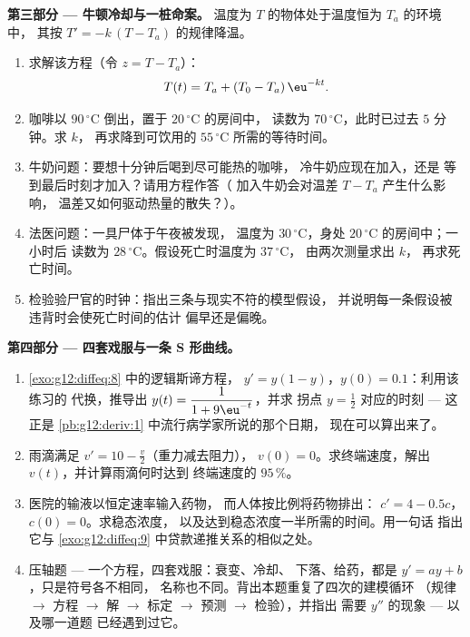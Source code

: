 \begin{problem}
\medskip
\noindent\textbf{第三部分 --- 牛顿冷却与一桩命案。}
温度为 $T$ 的物体处于温度恒为 $T_a$ 的环境中，
其按 $T' = -k\,(T - T_a)$ 的规律降温。
\begin{enumerate}[resume]
  \item 求解该方程（令 $z = T - T_a$）：
        \[
        T(t) = T_a + (T_0 - T_a)\,\eu^{-kt} .
        \]
  \item 咖啡以 $90\,^\circ$C 倒出，置于 $20\,^\circ$C 的房间中，
        读数为 $70\,^\circ$C，此时已过去 $5$ 分钟。求 $k$，
        再求降到可饮用的
        $55\,^\circ$C 所需的等待时间。
  \item 牛奶问题：要想十分钟后喝到尽可能热的咖啡，
        冷牛奶应现在加入，还是
        等到最后时刻才加入？请用方程作答（
        加入牛奶会对温差 $T - T_a$ 产生什么影响，
        温差又如何驱动热量的散失？）。
  \item 法医问题：一具尸体于午夜被发现，
        温度为 $30\,^\circ$C，身处 $20\,^\circ$C 的房间中；一小时后
        读数为 $28\,^\circ$C。假设死亡时温度为 $37\,^\circ$C，
        由两次测量求出 $k$，
        再求死亡时间。
  \item 检验验尸官的时钟：指出三条与现实不符的模型假设，
        并说明每一条假设被违背时会使死亡时间的估计
        偏早还是偏晚。
\end{enumerate}

\medskip
\noindent\textbf{第四部分 --- 四套戏服与一条 S 形曲线。}
\begin{enumerate}[resume]
  \item \cref{exo:g12:diffeq:8} 中的逻辑斯谛方程，
        $y' = y(1 - y)$，$y(0) = 0.1$：利用该练习的
        代换，推导出
        $y(t) = \dfrac{1}{1 + 9\eu^{-t}}$，并求
        拐点 $y = \frac12$ 对应的时刻 --- 这正是
        \cref{pb:g12:deriv:1} 中流行病学家所说的那个日期，
        现在可以算出来了。
  \item 雨滴满足 $v' = 10 - \frac v2$（重力减去阻力），
        $v(0) = 0$。求终端速度，解出
        $v(t)$，并计算雨滴何时达到
        终端速度的 $95\,\%$。
  \item 医院的输液以恒定速率输入药物，
        而人体按比例将药物排出：
        $c' = 4 - 0.5c$，$c(0) = 0$。求稳态浓度，
        以及达到稳态浓度一半所需的时间。用一句话
        指出它与
        \cref{exo:g12:diffeq:9} 中贷款递推关系的相似之处。
  \item 压轴题 --- 一个方程，四套戏服：衰变、冷却、
        下落、给药，都是 $y' = ay + b$，只是符号各不相同，
        名称也不同。背出本题重复了四次的建模循环
        （规律 $\to$ 方程 $\to$ 解 $\to$
        标定 $\to$ 预测 $\to$ 检验），并指出
        需要 $y''$ 的现象 --- 以及哪一道题
        已经遇到过它。
\end{enumerate}
\end{problem}

